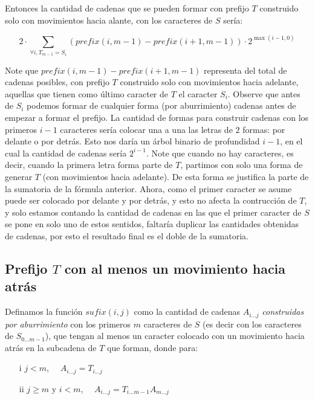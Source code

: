 \documentclass[a4paper]{article}
\begin{document}
    Entonces la cantidad de cadenas que se pueden formar con prefijo $T$ construido solo con
    movimientos hacia alante, con los caracteres de $S$ ser\'ia:

    $$ 2 \cdot \sum_{\forall i, T_{m-1} = S_i} (prefix(i,m-1) - prefix(i+1,m-1)) \cdot 2^{\max(i-1,0)} $$

    Note que $prefix(i,m-1) - prefix(i+1,m-1)$ representa del total de cadenas posibles,
    con prefijo $T$ construido solo con movimientos hacia adelante, aquellas que tienen como
    \'ultimo caracter de $T$ el caracter $S_i$. Observe que antes de $S_{i}$ podemos formar
    de cualquier forma (por aburrimiento) cadenas antes de empezar a formar el prefijo.
    La cantidad de formas para construir cadenas con los primeros $i-1$ caracteres ser\'ia
    colocar una a una las letras de $2$ formas: por delante o por detr\'as. Esto nos dar\'ia
    un \'arbol binario de profundidad $i-1$, en el cual la cantidad de cadenas ser\'ia $2^{i-1}$.
    Note que cuando no hay caracteres, es decir, cuando la primera letra forma parte de $T$,
    partimos con solo una forma de generar $T$ (con movimientos hacia adelante).
    De esta forma se justifica la parte de la sumatoria de la f\'ormula anterior. Ahora, como 
    el primer caracter se asume puede ser colocado por delante y por detr\'as, y esto no afecta la contrucci\'on de $T$,
    y solo estamos contando la cantidad de cadenas en las que el primer caracter de $S$ se pone en solo uno de estos sentidos, faltar\'ia duplicar las 
    cantidades obtenidas de cadenas, por esto el resultado final es el doble de la sumatoria.

    \subsection*{Prefijo $T$ con al menos un movimiento hacia atr\'as}

    Definamos la funci\'on $sufix(i,j)$ como la cantidad de cadenas $A_{i...j}$
    \textit{construidas por aburrimiento} con los primeros $m$ 
    caracteres de $S$ (es decir con los caracteres de $S_{0...m-1}$), que tengan
    al menos un caracter colocado con un movimiento hacia atr\'as en la subcadena de $T$ que forman,
    donde para:

    \begin{itemize}
    	\item[i] $j < m$, $\quad A_{i...j} = T_{i...j}$
    	\item[ii] $j \geq m $ y $i < m $, $\quad A_{i...j} = T_{i...m-1}A_{m...j}$
    \end{itemize}
\end{document}
